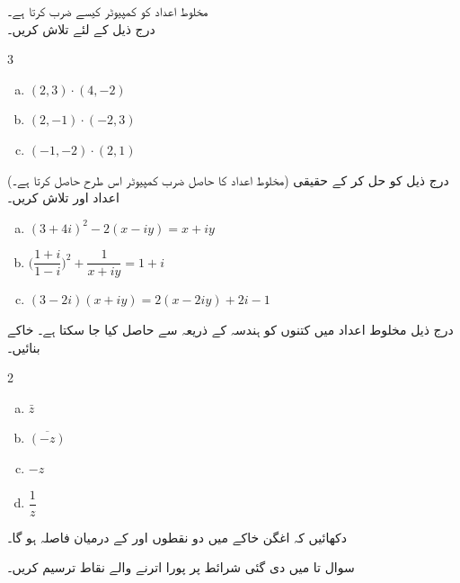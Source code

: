 \setcounter{questioncounter}{0}
مخلوط اعداد  کو کمپیوٹر  کیسے ضرب کرتا  ہے۔\\
درج ذیل کے لئے   تلاش کریں۔
\begin{multicols}{3}
\begin{enumerate}[a.]
\item
\((2,3)\cdot (4,-2)\)
\item
\((2,-1)\cdot(-2,3)\)
\item
\((-1,-2)\cdot (2,1)\)
\end{enumerate}
\end{multicols}
(مخلوط اعداد  کا حاصل ضرب کمپیوٹر اس طرح حاصل کرتا ہے۔)
 درج ذیل کو  حل کر کے حقیقی اعداد  اور   تلاش کریں۔
\begin{enumerate}[a.]
\item
\((3+4i)^2-2(x-iy)=x+iy\)
\item
\(\big(\dfrac{1+i}{1-i}\big)^2+\dfrac{1}{x+iy}=1+i \)
\item
\((3-2i)(x+iy)=2(x-2iy)+2i-1\)
\end{enumerate}


درج ذیل  مخلوط اعداد میں کتنوں کو   ہندسہ کے ذریعہ    سے حاصل کیا جا سکتا ہے۔ خاکے بنائیں۔
\begin{multicols}{2}
\begin{enumerate}[a.]
\item
\(\bar{z}\)
\item
\(\overline{(-z)}\)
\item
\(-z\)
\item
\(\dfrac{1}{z}\)
\end{enumerate}
\end{multicols}

دکھائیں کہ اغگن خاکے میں دو نقطوں  اور  کے  درمیان فاصلہ  ہو گا۔

سوال  تا   میں دی گئی  شرائط پر پورا اترنے والے   نقاط  ترسیم کریں۔

